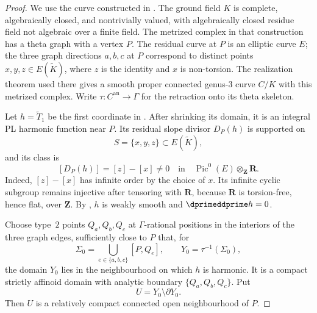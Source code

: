\begin{proof}
We use the curve constructed in \cite[\S17]{GJR26}.  The ground field $K$ is
complete, algebraically closed, and nontrivially valued, with algebraically
closed residue field not algebraic over a finite field.  The metrized complex
in that construction has a theta graph with a vertex $P$.  The residual
curve at $P$ is an elliptic curve $E$; the three graph directions $a,b,c$ at
$P$ correspond to distinct points $x,y,z\in E(\widetilde K)$, where $z$ is
the identity and $x$ is non-torsion.  The realization theorem used there
gives a smooth proper connected genus-$3$ curve $C/K$ with this metrized
complex.  Write $\tau:C^{\mathrm{an}}\to\Gamma$ for the retraction onto its
theta skeleton.

Let $h=\widetilde T_1$ be the first coordinate in
\cite[Proposition~17.4]{GJR26}.  After shrinking its domain, it is an integral
PL harmonic function near $P$.  Its residual slope divisor $D_P(h)$ is
supported on
\begin{equation}
\label{eq:ch19-harmonic-reg-support}
                         S=\{x,y,z\}\subset E(\widetilde K),
\end{equation}
and its class is
\begin{equation}
\label{eq:ch19-harmonic-reg-nonzero-class}
 [D_P(h)]=[z]-[x]\neq0
       \quad\text{in}\quad
 \operatorname{Pic}^0(E)\otimes_{\mathbf Z}\mathbf R.
\end{equation}
Indeed, $[z]-[x]$ has infinite order by the choice of $x$.  Its infinite
cyclic subgroup remains injective after tensoring with $\mathbf R$, because
$\mathbf R$ is torsion-free, hence flat, over $\mathbf Z$.  By
\cite[Proposition~10.17]{GJR26}, $h$ is weakly smooth and
$\dprimeddprime h=0$.

Choose type~$2$ points $Q_a,Q_b,Q_c$ at $\Gamma$-rational positions in the
interiors of the three graph edges, sufficiently close to $P$ that, for
\[
              \Sigma_0=\bigcup_{e\in\{a,b,c\}}[P,Q_e],
              \qquad Y_0=\tau^{-1}(\Sigma_0),
\]
the domain $Y_0$ lies in the neighbourhood on which $h$ is harmonic.  It is
a compact strictly affinoid domain with analytic boundary
$\{Q_a,Q_b,Q_c\}$.  Put
\begin{equation}
\label{eq:ch19-harmonic-reg-open-star}
                         U=Y_0\setminus\partial Y_0.
\end{equation}
Then $U$ is a relatively compact connected open neighbourhood of $P$.


\end{proof}
